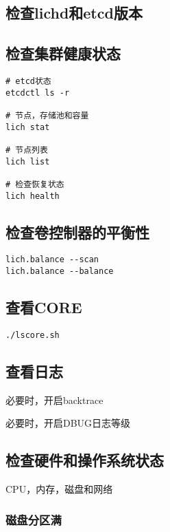 \subsection{检查lichd和etcd版本}

\subsection{检查集群健康状态}

\begin{lstlisting}
# etcd状态
etcdctl ls -r

# 节点，存储池和容量
lich stat

# 节点列表
lich list

# 检查恢复状态
lich health
\end{lstlisting}

\subsection{检查卷控制器的平衡性}

\begin{lstlisting}
lich.balance --scan
lich.balance --balance
\end{lstlisting}

\subsection{查看CORE}

\begin{lstlisting}
./lscore.sh
\end{lstlisting}

\subsection{查看日志}

必要时，开启backtrace

必要时，开启DBUG日志等级

\subsection{检查硬件和操作系统状态}

CPU，内存，磁盘和网络

\subsubsection{磁盘分区满}



